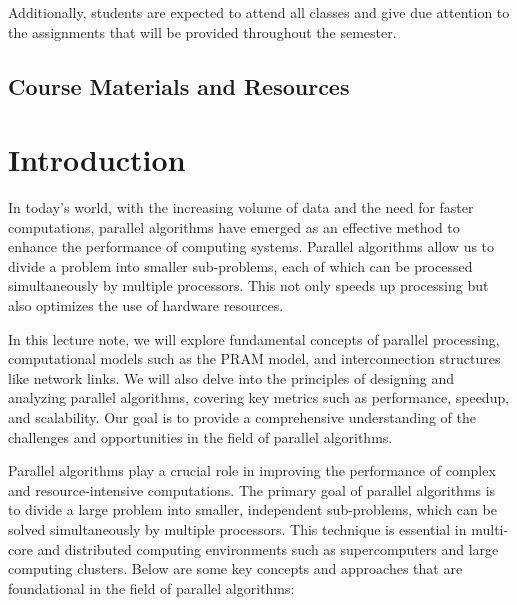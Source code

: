 \documentclass[a4paper, 10pt]{book}
\begin{document}
        Additionally, students are expected to attend all classes and give due attention to the assignments that will be provided throughout the semester.
        
    \section{Course Materials and Resources}

    \tableofcontents
    
    \chapter{{\bold Introduction}}


        In today’s world, with the increasing volume of data and the need for faster computations, parallel algorithms have emerged as an effective method to enhance the performance of computing systems. Parallel algorithms allow us to divide a problem into smaller sub-problems, each of which can be processed simultaneously by multiple processors. This not only speeds up processing but also optimizes the use of hardware resources.

        In this lecture note, we will explore fundamental concepts of parallel processing, computational models such as the PRAM model, and interconnection structures like network links. We will also delve into the principles of designing and analyzing parallel algorithms, covering key metrics such as performance, speedup, and scalability. Our goal is to provide a comprehensive understanding of the challenges and opportunities in the field of parallel algorithms.

        Parallel algorithms play a crucial role in improving the performance of complex and resource-intensive computations. The primary goal of parallel algorithms is to divide a large problem into smaller, independent sub-problems, which can be solved simultaneously by multiple processors. This technique is essential in multi-core and distributed computing environments such as supercomputers and large computing clusters. Below are some key concepts and approaches that are foundational in the field of parallel algorithms:
\end{document}
